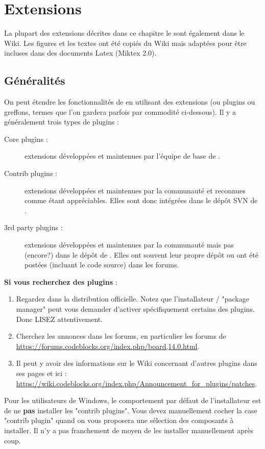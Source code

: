 \chapter{Extensions}\label{sec:plugins}

La plupart des extensions décrites dans ce chapitre le sont également dans le Wiki. Les figures et les textes ont été copiés du Wiki mais adaptées pour être incluses dans des documents Latex (Miktex 2.0). 

\section{Généralités}

On peut étendre les fonctionnalités de \codeblocks en utilisant des extensions (ou plugins ou greffons, termes que l'on gardera parfois par commodité ci-dessous). Il y a généralement trois types de plugins :
\begin{description}
\item[Core plugins :] extensions développées et maintenues par l'équipe de base de \codeblocks.
\item[Contrib plugins :] extensions développées et maintenues par la communauté et reconnues comme étant appréciables. Elles sont donc intégrées dans le dépôt SVN de \codeblocks.
\item[3rd party plugins :] extensions développées et maintenues par la communauté mais pas (encore?) dans le dépôt de \codeblocks. Elles ont souvent leur propre dépôt ou ont été postées (incluant le code source) dans les forums.
\end{description}

\textbf{Si vous recherchez des plugins} :
\begin{enumerate}
\item Regardez dans la distribution officielle. Notez que l'installateur / "package manager" peut vous demander d'activer spécifiquement certains des plugins. Donc LISEZ attentivement.
\item Cherchez les annonces dans les forums, en particulier les forums de \url{https://forums.codeblocks.org/index.php/board,14.0.html}.
\item Il peut y avoir des informations sur le Wiki concernant d'autres plugins dans ses pages et ici : \url{https://wiki.codeblocks.org/index.php/Announcement_for_plugins/patches}.
\end{enumerate}

Pour les utilisateurs de Windows, le comportement par défaut de l'installateur est de ne \textbf{pas} installer les "contrib plugins". Vous devez manuellement cocher la case "contrib plugin" quand on vous proposera une sélection des composants à installer. Il n'y a pas franchement de moyen de les installer manuellement après coup.


